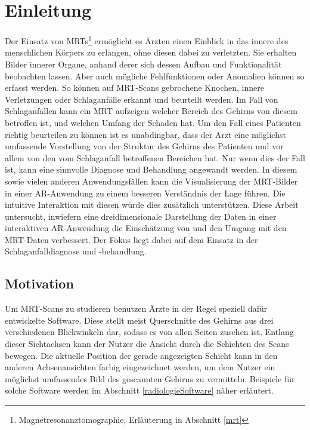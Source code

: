 %

\chapter{Einleitung}

Der Einsatz von MRTs\footnote{ Magnetresonanztomographie, Erläuterung in Abschnitt \ref{mrt}} ermöglicht es Ärzten einen Einblick in das innere des menschlichen Körpers zu erlangen, ohne diesen dabei zu verletzten. Sie erhalten Bilder innerer Organe, anhand derer sich dessen Aufbau und Funktionalität beobachten lassen. Aber auch mögliche Fehlfunktionen oder Anomalien können so erfasst werden. So können auf MRT-Scans gebrochene Knochen, innere Verletzungen oder Schlaganfälle erkannt und beurteilt werden. Im Fall von Schlaganfällen kann ein MRT aufzeigen welcher Bereich des Gehirns von diesem betroffen ist, und welchen Umfang der Schaden hat.
Um den Fall eines Patienten richtig beurteilen zu können ist es unabdingbar, dass der Arzt eine möglichst umfassende Vorstellung von der Struktur des Gehirns des Patienten und vor allem von den vom Schlaganfall betroffenen Bereichen hat. Nur wenn dies der Fall ist, kann eine sinnvolle Diagnose und Behandlung angewandt werden.
In diesem sowie vielen anderen Anwendungsfällen kann die Visualisierung der MRT-Bilder in einer AR-Anwendung zu einem besseren Verständnis der Lage führen. Die intuitive Interaktion mit diesen würde dies zusätzlich unterstützen. 
Diese Arbeit untersucht, inwiefern eine dreidimensionale Darstellung der Daten in einer interaktiven AR-Anwendung die Einschätzung von und den Umgang mit den MRT-Daten verbessert. Der Fokus liegt dabei auf dem Einsatz in der Schlaganfalldiagnose und -behandlung.  

\begin{figure}[!htb]
	\centering
	\caption{}
	\label{img:teaser}
\end{figure}
\FloatBarrier

\section{Motivation}
\label{motivation}

Um MRT-Scans zu studieren benutzen Ärzte in der Regel speziell dafür entwickelte Software. Diese stellt meist Querschnitte des Gehirns aus drei verschiedenen Blickwinkeln dar, sodass es von allen Seiten zusehen ist. Entlang dieser Sichtachsen kann der Nutzer die Ansicht durch die Schichten des Scans bewegen. Die aktuelle Position der gerade angezeigten Schicht kann in den anderen Achsenansichten farbig eingezeichnet werden, um dem Nutzer ein möglichst umfassendes Bild des gescannten Gehirns zu vermitteln. 
Beispiele für solche Software werden im Abschnitt \ref{radiologieSoftware} näher erläutert.

